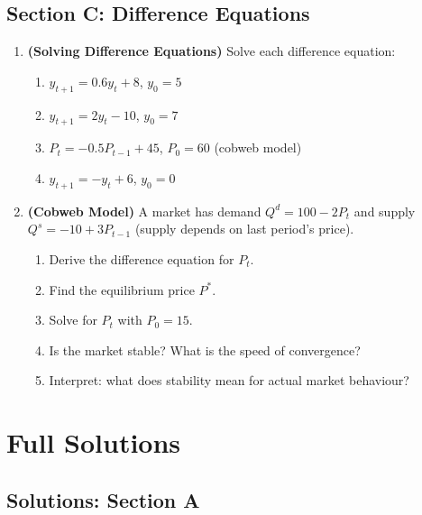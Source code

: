 \documentclass[12pt, a4paper]{article}
\theoremstyle{definition}
\begin{document}
\subsection{Section C: Difference Equations}

\begin{enumerate}[label=\textbf{C\arabic*.},leftmargin=2.5em]

\item \textbf{(Solving Difference Equations)} Solve each difference equation:
\begin{enumerate}[label=(\alph*)]
  \item $y_{t+1} = 0.6y_t + 8$, \quad $y_0 = 5$
  \item $y_{t+1} = 2y_t - 10$, \quad $y_0 = 7$
  \item $P_{t} = -0.5P_{t-1} + 45$, \quad $P_0 = 60$ \quad (cobweb model)
  \item $y_{t+1} = -y_t + 6$, \quad $y_0 = 0$
\end{enumerate}

\item \textbf{(Cobweb Model)} A market has demand $Q^d = 100-2P_t$ and
supply $Q^s = -10+3P_{t-1}$ (supply depends on last period's price).
\begin{enumerate}[label=(\alph*)]
  \item Derive the difference equation for $P_t$.
  \item Find the equilibrium price $P^*$.
  \item Solve for $P_t$ with $P_0 = 15$.
  \item Is the market stable? What is the speed of convergence?
  \item Interpret: what does stability mean for actual market behaviour?
\end{enumerate}

\end{enumerate}

\newpage
\section{Full Solutions}

\subsection{Solutions: Section A}
\end{document}
